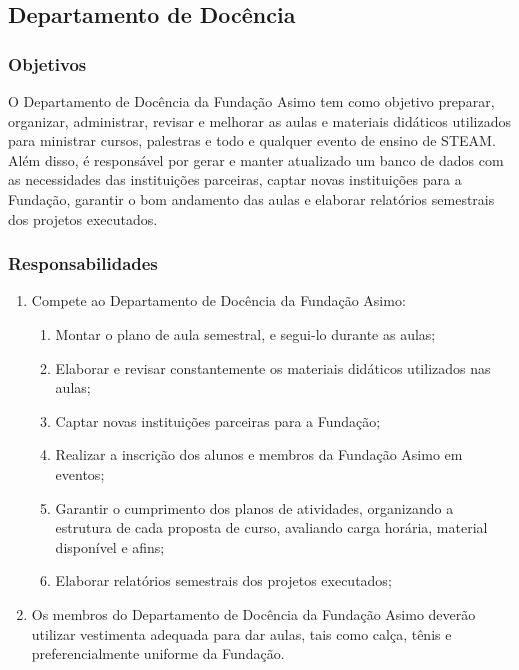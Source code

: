     \subsection{Departamento de Docência}
        \subsubsection{Objetivos}
            O Departamento de Docência da Fundação Asimo tem como objetivo preparar, organizar, administrar, revisar e melhorar as aulas e materiais didáticos utilizados para ministrar cursos, palestras e todo e qualquer evento de ensino de STEAM. Além disso, é responsável por gerar e manter atualizado um banco de dados com as necessidades das instituições parceiras, captar novas instituições para a Fundação, garantir o bom andamento das aulas e elaborar relatórios semestrais dos projetos executados.
        \subsubsection{Responsabilidades}
            \begin{enumerate}
                \item Compete ao Departamento de Docência da Fundação Asimo:
                \begin{enumerate}
                    \item Montar o plano de aula semestral, e segui-lo durante as aulas; 
                    \item Elaborar e revisar constantemente os materiais didáticos utilizados nas aulas;
                    \item Captar novas instituições parceiras para a Fundação;
                    \item Realizar a inscrição dos alunos e membros da Fundação Asimo em eventos;
                    \item Garantir o cumprimento dos planos de atividades, organizando a estrutura de cada proposta de curso, avaliando carga horária, material disponível e afins;
                    \item Elaborar relatórios semestrais dos projetos executados;
                \end{enumerate}
                \item Os membros do Departamento de Docência da Fundação Asimo deverão utilizar vestimenta adequada para dar aulas, tais como calça, tênis e preferencialmente uniforme da Fundação.
            \end{enumerate}
            
